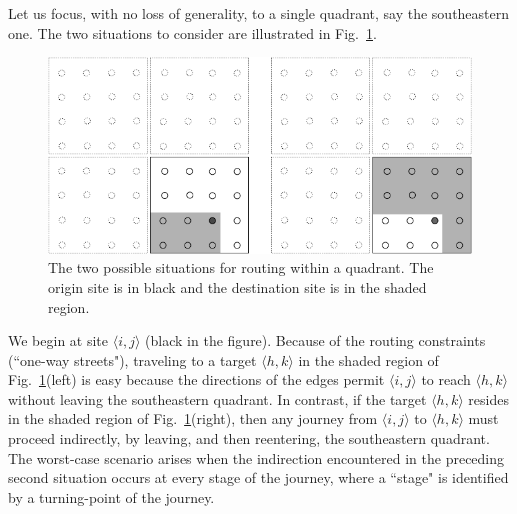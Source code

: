 \begin{itemize}
{{Let us focus, with no loss of generality, to a single quadrant, say the southeastern one. The two situations to consider are illustrated in Fig.~\ref{fig:routingWorstCase}.
 \begin{figure}[hbt]
\begin{center}
       \includegraphics[scale=0.35]{FiguresGraph/routingWorstCase}
       \caption{The two possible situations for routing within a quadrant. The origin site is in black and the destination site is in the shaded region.}
  \label{fig:routingWorstCase}
\end{center}
\end{figure}
We begin at site $\langle i,j \rangle$ (black in the figure).  Because of the routing constraints (``one-way streets"), traveling to a target $\langle h,k \rangle$ in the shaded region of Fig.~\ref{fig:routingWorstCase}(left) is easy because the directions of the edges permit $\langle i,j \rangle$ to reach $\langle h,k \rangle$ without leaving the southeastern quadrant.  In contrast, 
if the target $\langle h,k \rangle$ resides in the shaded region of Fig.~\ref{fig:routingWorstCase}(right), then any journey from $\langle i,j \rangle$ to $\langle h,k \rangle$ must proceed indirectly, by leaving, and then reentering, the southeastern quadrant.  The worst-case scenario arises when the indirection encountered in the preceding second situation occurs at every stage of the journey, where a ``stage" is identified by a turning-point of the journey.

\smallskip

}}
\end{itemize}
